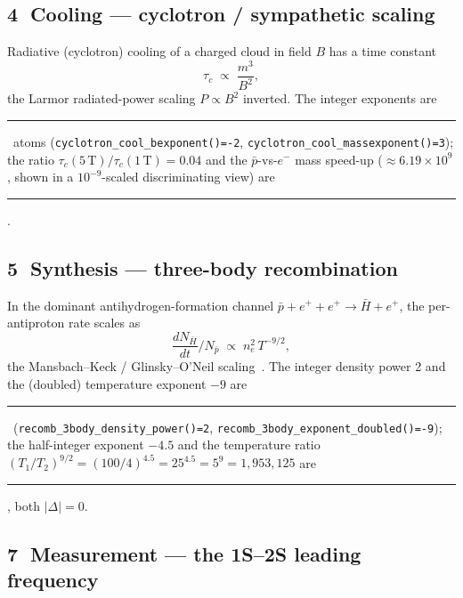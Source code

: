 \documentclass[11pt,a4paper]{article}
\newcommand{\tierdisc}[1]{\textcolor{#1}{\rule[0.05ex]{1.0ex}{1.0ex}}}
\newcommand{\tierBlue}{\tierdisc{blue!70!black}}
\newcommand{\tierGreen}{\tierdisc{green!60!black}}
\begin{document}
\subsection{\textcircled{\scriptsize 4} Cooling --- cyclotron / sympathetic scaling}

Radiative (cyclotron) cooling of a charged cloud in field $B$ has a time
constant
\begin{equation}
\tau_c \;\propto\; \frac{m^3}{B^{2}},
\label{eq:cool}
\end{equation}
the Larmor radiated-power scaling $P\!\propto\!B^2$ inverted. The integer
exponents are \tierBlue\ atoms (\verb|cyclotron_cool_bexponent()=-2|,
\verb|cyclotron_cool_massexponent()=3|); the ratio
$\tau_c(5\,\mathrm{T})/\tau_c(1\,\mathrm{T})=0.04$ and the
$\bar p$-vs-$e^-$ mass speed-up ($\approx\!6.19\!\times\!10^9$, shown in a
$10^{-9}$-scaled discriminating view) are \tierGreen.

\subsection{\textcircled{\scriptsize 5} Synthesis --- three-body recombination}

In the dominant antihydrogen-formation channel
$\bar p + e^+ + e^+ \to \bar H + e^+$, the per-antiproton rate scales as
\begin{equation}
\frac{d N_{\bar H}}{dt}\Big/ N_{\bar p}
\;\propto\; n_e^{2}\, T^{-9/2},
\label{eq:recomb}
\end{equation}
the Mansbach--Keck / Glinsky--O'Neil scaling~\citep{glinsky1991oneil}. The
integer density power 2 and the (doubled) temperature exponent $-9$ are
\tierBlue\ (\verb|recomb_3body_density_power()=2|,
\verb|recomb_3body_exponent_doubled()=-9|); the half-integer exponent
$-4.5$ and the temperature ratio
$(T_1/T_2)^{9/2}=(100/4)^{4.5}=25^{4.5}=5^9=1{,}953{,}125$ are \tierGreen,
both $|\Delta|=0$.

\subsection{\textcircled{\scriptsize 7} Measurement --- the 1S--2S leading frequency}
\end{document}
